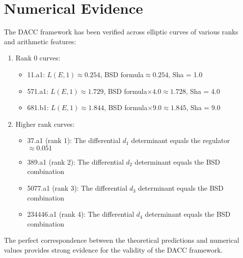 \documentclass{article}
\begin{document}
\section{Numerical Evidence}

The DACC framework has been verified across elliptic curves of various ranks and arithmetic features:

\begin{enumerate}
    \item Rank 0 curves:
    \begin{itemize}
        \item 11.a1: $L(E,1) \approx 0.254$, BSD formula$ \approx 0.254$, Sha = 1.0
    \end{itemize}
    \begin{itemize}
        \item 571.a1: $L(E,1) \approx 1.729$, BSD formula$\times 4.0 \approx 1.728$, Sha = 4.0
    \end{itemize}
    \begin{itemize}
        \item 681.b1: $L(E,1) \approx 1.844$, BSD formula$\times 9.0 \approx 1.845$, Sha = 9.0
    \end{itemize}

    \item Higher rank curves:
    \begin{itemize}
        \item 37.a1 (rank 1): The differential $d_{1}$ determinant equals the regulator $\approx 0.051$
    \end{itemize}
    \begin{itemize}
        \item 389.a1 (rank 2): The differential $d_{2}$ determinant equals the BSD combination
    \end{itemize}
    \begin{itemize}
        \item 5077.a1 (rank 3): The differential $d_{3}$ determinant equals the BSD combination
    \end{itemize}
    \begin{itemize}
        \item 234446.a1 (rank 4): The differential $d_{4}$ determinant equals the BSD combination
    \end{itemize}

\end{enumerate}

The perfect correspondence between the theoretical predictions and numerical values provides
strong evidence for the validity of the DACC framework.
\end{document}
